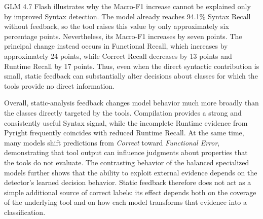 GLM 4.7 Flash illustrates why the Macro-F1 increase cannot be explained only by improved Syntax detection. The model already reaches 94.1\% Syntax Recall without feedback, so the tool raises this value by only approximately six percentage points. Nevertheless, its Macro-F1 increases by seven points. The principal change instead occurs in Functional Recall, which increases by approximately 24 points, while Correct Recall decreases by 13 points and Runtime Recall by 17 points. Thus, even when the direct syntactic contribution is small, static feedback can substantially alter decisions about classes for which the tools provide no direct information.

Overall, static-analysis feedback changes model behavior much more broadly than the classes directly targeted by the tools. Compilation provides a strong and consistently useful Syntax signal, while the incomplete Runtime evidence from Pyright frequently coincides with reduced Runtime Recall. At the same time, many models shift predictions from \emph{Correct} toward \emph{Functional Error}, demonstrating that tool output can influence judgments about properties that the tools do not evaluate. The contrasting behavior of the balanced specialized models further shows that the ability to exploit external evidence depends on the detector's learned decision behavior. Static feedback therefore does not act as a simple additional source of correct labels: its effect depends both on the coverage of the underlying tool and on how each model transforms that evidence into a classification.